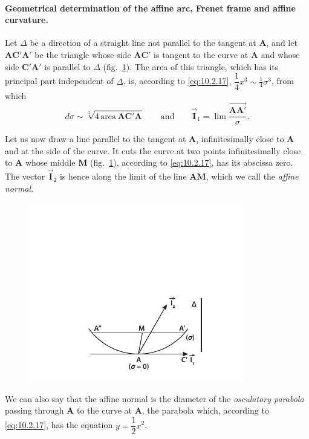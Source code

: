 \documentclass[leqno,11pt]{book}
\numberwithin{equation}{chapter}
\theoremstyle{shape1}
\theoremstyle{shapesmall}
\newcommand{\rvec}[1]{\vec{\mathbf{#1}}}
\newcommand{\ivec}{\rvec{I}}
\begin{document}
\paragraph{Geometrical determination of the affine arc, Frenet frame and affine curvature.}
\label{sec:140}
Let $\Delta$ be a direction of a straight line not parallel to the tangent at $\mathbf{A}$, and let $\mathbf{AC}'\mathbf{A}'$ be the triangle whose side $\mathbf{AC}'$ is tangent to the curve at $\mathbf{A}$ and whose side $\mathbf{C}'\mathbf{A}'$ is parallel to $\Delta$ (fig.~\ref{fig:5}). The area of this triangle, which has its principal part independent of $\Delta$, is, according to \eqref{eq:10.2.17}, $\dfrac{1}{4}x^{3}\sim\frac{1}{4}\sigma^{3}$, from which
\begin{equation}
  \label{eq:10.2.19}
  d\sigma\sim\sqrt[3]{4\,\text{area}\,\mathbf{AC}'\mathbf{A}} \qquad\text{and}\qquad\ivec_{1}=\lim\frac{\overrightarrow{\mathbf{AA}'}}{\sigma}.
\end{equation}

Let us now draw a line parallel to the tangent at $\mathbf{A}$, infinitesimally close to $\mathbf{A}$ and at the side of the curve. It cuts the curve at two points infinitesimally close to $\mathbf{A}$ whose middle $\mathbf{M}$ (fig.~\ref{fig:5}), according to \eqref{eq:10.2.17}, has its abscissa zero. The vector $\ivec_{2}$ is hence along the limit of the line $\mathbf{AM}$, which we call the \emph{affine normal}.
\begin{figure}[h]
  \centering
\includegraphics[scale=2]{cartangrp-f5}  
  \caption{}
  \label{fig:5}
\end{figure}

We can also say that the affine normal is the diameter of the \emph{osculatory parabola} passing through $\mathbf{A}$ to the curve at $\mathbf{A}$, the parabola which, according to \eqref{eq:10.2.17}, has the equation $y=\dfrac{1}{2}x^{2}$.
\end{document}
